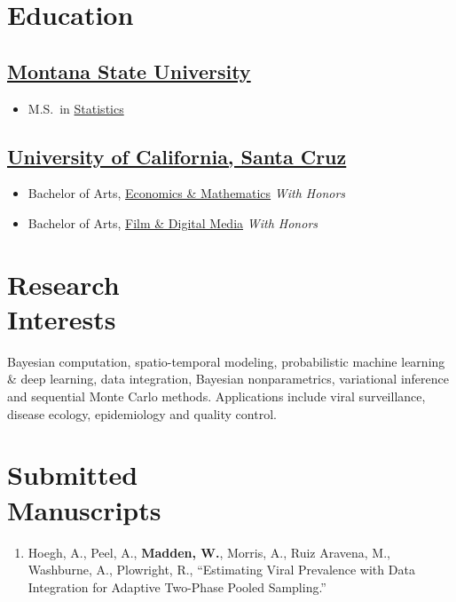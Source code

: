 \documentclass{wm_cv}
\begin{document}
\maketitle%

\section{Education}

\subsection{\href{https://www.montana.edu/}{Montana State University}} 
\vspace{-\parskip}%
\begin{itemize}[label={}]
  \item M.S.\ in \href{http://catalog.montana.edu/graduate/letters-science/mathematical-sciences/ms-statistics/}{Statistics} 
\end{itemize}

\subsection{\href{https://www.ucsc.edu/}{University of California, Santa Cruz}}
\vspace{-\parskip}%
\begin{itemize}[label={}]
  \item Bachelor of Arts, \href{https://economics.ucsc.edu/academics/undergraduate-program/majors-minor/econ-math.html}{Economics \& Mathematics} \emph{With Honors}
  \item Bachelor of Arts, \href{https://admissions.sa.ucsc.edu/majors/filmdigital}{Film \& Digital Media} \emph{With Honors}
\end{itemize}

\section{Research \\ Interests}

Bayesian computation, spatio-temporal modeling, probabilistic machine learning \& deep learning, data integration, Bayesian nonparametrics, variational inference and sequential Monte Carlo methods. Applications include viral surveillance, disease ecology, epidemiology and quality control. 

\section{Submitted \\ Manuscripts}
\begin{enumerate}
  \item Hoegh, A., Peel, A., \textbf{Madden, W.}, Morris, A., Ruiz Aravena, M., Washburne, A., Plowright, R., ``Estimating Viral Prevalence with Data Integration for Adaptive Two-Phase Pooled Sampling.''
\end{enumerate}
\end{document}
